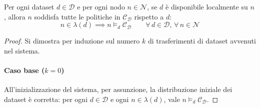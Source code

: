 \begin{theorem}
    \label{teo:correttezza_locale}
    Per ogni dataset $d \in \mathcal{D}$ e per ogni nodo $n \in \mathcal{N}$, se $d$ è disponibile localmente su $n$, allora $n$ soddisfa tutte le politiche in $\mathcal{C_D}$ rispetto a $d$:
    \begin{equation}
        n \in \lambda(d) \implies n \models_d \mathcal{C_D}
        \qquad
        \forall\, d \in \mathcal{D},\, \forall\, n \in \mathcal{N}
    \end{equation}
    \begin{proof}
        Si dimostra per induzione sul numero $k$ di trasferimenti di dataset avvenuti nel sistema. 
        
        \paragraph{Caso base ($k = 0$)} All'inizializzazione del sistema, per assunzione, la distribuzione iniziale dei dataset è corretta: per ogni $d \in \mathcal{D}$ e ogni $n \in \lambda(d)$, vale $n \models_d \mathcal{C_D}$.
        

\end{proof}
\end{theorem}
